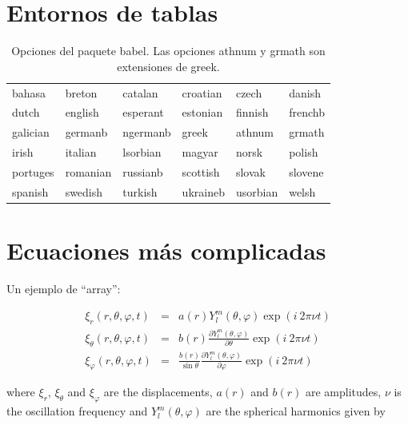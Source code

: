 \documentclass[a4paper]{article}
\begin{document}
\section{Entornos de tablas}

\begin{table}[ht]
\centering
\begin{sffamily}
\begin{tabular}{|llllll|}
\hline
 bahasa	& breton		& catalan 		& croatian 	& czech 		& danish   \\
 dutch	& english		& esperant 	&estonian 	&finnish 		& frenchb\\
 galician 	& germanb	& ngermanb 	& greek		& athnum 		& grmath\\
 irish 	& italian 		&lsorbian 		& magyar 		& norsk 		& polish\\
 portuges	& romanian 	& russianb 	&scottish 		& slovak 		& slovene\\
 spanish 	& swedish 	& turkish 		&ukraineb		& usorbian 	&welsh \\
\hline
\end{tabular}
\end{sffamily}
\label{tab:OpcBabel}
\caption{Opciones del paquete babel. Las opciones athnum y  grmath son extensiones de greek.}
\end{table}


\section{Ecuaciones más complicadas}

Un ejemplo de ``array'':

\begin{equation}
\label{ec:solucion}
\begin{array}{lcl}
\xi_{r}(r,\theta,\varphi,t) 		& = & a(r)Y_{l}^{m}(\theta,\varphi)\exp(i\ 2\pi\nu t)\\
\xi_{\theta}(r,\theta,\varphi,t) 	& = & b(r)\frac{\partial Y_{l}^{m}(\theta,\varphi)}{\partial\theta}\exp(i\ 2\pi\nu t)\\
\xi_{\varphi}(r,\theta,\varphi,t) & = & \frac{b(r)}{\sin \theta}\frac{\partial Y_{l}^{m}(\theta,\varphi)}{\partial\varphi}\exp(i\ 2\pi\nu t)
\end{array}
\end{equation}


where $\xi_{r}$, $\xi_{\theta}$ and $\xi_{\varphi}$ are the displacements, $a(r)$ and $b(r)$ are amplitudes, $\nu$ is the oscillation frequency and $Y_{l}^{m}(\theta,\varphi)$ are the spherical harmonics given by
\end{document}
